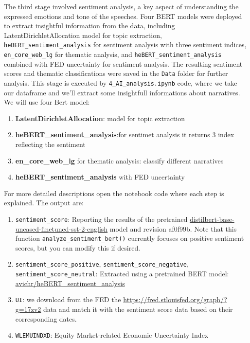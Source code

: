 \documentclass{article}
\begin{document}
The third stage involved sentiment analysis, a key aspect of understanding the expressed emotions and tone of the speeches. Four BERT models were deployed to extract insightful information from the data, including LatentDirichletAllocation model for topic extraction, \texttt{heBERT\_sentiment\_analysis} for sentiment analysis with three sentiment indices, \texttt{en\_core\_web\_lg} for thematic analysis, and \texttt{heBERT\_sentiment\_analysis} combined with FED uncertainty for sentiment analysis. The resulting sentiment scores and thematic classifications were saved in the \texttt{Data} folder for further analysis.
This stage is executed by \texttt{4\_AI\_analysis.ipynb} code, where  we take our dataframe and we'll extract some insightfull informations about narratives. 
We will use four Bert model:
\begin{enumerate}
    \item \textbf{LatentDirichletAllocation}: model for topic extraction
    \item \textbf{heBERT\_sentiment\_analysis}:for sentimet analysis it returns 3 index reflecting the sentiment
    \item \textbf{en\_core\_web\_lg} for thematic analysis: classify different narratives
    \item  \textbf{heBERT\_sentiment\_analysis} with FED uncertainty 
\end{enumerate}
For more detailed descriptions open the notebook code where each step is explained.
The output are:
\begin{enumerate}
    \item \texttt{sentiment\_score}: Reporting the results of the pretrained \href{https://huggingface.co/distilbert-base-uncased-finetuned-sst-2-english}{distilbert-base-uncased-finetuned-sst-2-english} model and revision af0f99b. Note that this function \texttt{analyze\_sentiment\_bert()} currently focuses on positive sentiment scores, but you can modify this if desired.

    \item \texttt{sentiment\_score\_positive}, \texttt{sentiment\_score\_negative},\\ \texttt{sentiment\_score\_neutral}: Extracted using a pretrained BERT model: \\\cite{chriqui2021hebert} \href{https://huggingface.co/avichr/heBERT_sentiment_analysis}{avichr/heBERT\_sentiment\_analysis}
    \item \texttt{UI}: we download from the FED the \href{Policy Uncertainty Index}{https://fred.stlouisfed.org/graph/?g=17zv2} data and match it with the sentiment score data
based on their corresponding dates.
    \item \texttt{WLEMUINDXD}: Equity Market-related Economic Uncertainty Index
\end{enumerate}
\end{document}
